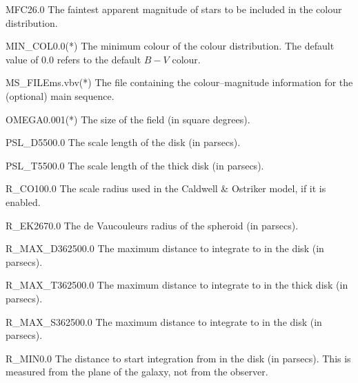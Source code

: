 \begin{key}{MFC}{26.0}{}
The faintest apparent magnitude of stars to be included in the colour 
distribution.
\end{key}

\begin{key}{MIN\_COL}{0.0}{(*)}
The minimum colour of the colour distribution. The default value of 0.0 
refers to the default $B-V$ colour.
\end{key}

\begin{key}{MS\_FILE}{ms.vbv}{(*)}
The file containing the colour--magnitude information for the (optional)
main sequence.
\end{key}

\begin{key}{OMEGA}{0.001}{(*)}
The size of the field (in square degrees).
\end{key}

\begin{key}{PSL\_D}{5500.0}{}
The scale length of the disk (in parsecs).
\end{key}

\begin{key}{PSL\_T}{5500.0}{}
The scale length of the thick disk (in parsecs).
\end{key}

\begin{key}{R\_CO}{100.0}{}
The scale radius used in the Caldwell \& Ostriker model, if it is enabled.
\end{key}

\begin{key}{R\_EK}{2670.0}{}
The de Vaucouleurs radius of the spheroid (in parsecs).
\end{key}

\begin{key}{R\_MAX\_D}{362500.0}{}
The maximum distance to integrate to in the disk (in parsecs).
\end{key}

\begin{key}{R\_MAX\_T}{362500.0}{}
The maximum distance to integrate to in the thick disk (in parsecs).
\end{key}

\begin{key}{R\_MAX\_S}{362500.0}{}
The maximum distance to integrate to in the disk (in parsecs).
\end{key}

\begin{key}{R\_MIN}{0.0}{}
The distance to start integration from in the disk (in parsecs). This is
measured from the plane of the galaxy, not from the observer.
\end{key}

